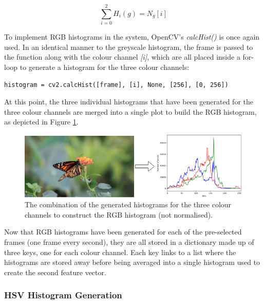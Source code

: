 \begin{equation}
\label{eq:rgb-histogram}
    \sum_{i=0}^{2} H_i(g)=N_g[i]
\end{equation}

To implement RGB histograms in the system, OpenCV's \textit{calcHist()} is once again used. In an identical manner to the greyscale histogram, the frame is passed to the function along with the colour channel \textit{[i]}, which are all placed inside a for-loop to generate a histogram for the three colour channels:

\begin{lstlisting}[numbers=none]
histogram = cv2.calcHist([frame], [i], None, [256], [0, 256])
\end{lstlisting}

At this point, the three individual histograms that have been generated for the three colour channels are merged into a single plot to build the RGB histogram, as depicted in Figure \ref{fig:implementation-rgb_not_normalised}.

\begin{figure}[h] 
\centerline{\includegraphics[width=\textwidth]{figures/implementation/rgb_not_normalised.png}}
\caption{\label{fig:implementation-rgb_not_normalised}The combination of the generated histograms for the three colour channels to construct the RGB histogram (not normalised).}
\end{figure}

Now that RGB histograms have been generated for each of the pre-selected frames (one frame every second), they are all stored in a dictionary made up of three keys, one for each colour channel. Each key links to a list where the histograms are stored away before being averaged into a single histogram used to create the second feature vector. 


\subsubsection{HSV Histogram Generation}

